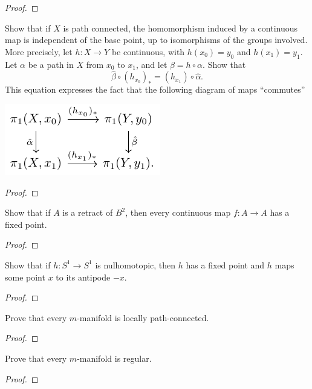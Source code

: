\begin{proof}
\end{proof}
\newpage
\begin{problem}[Munkres \S53, Ex.\,6]
Show that if $X$ is path connected, the homomorphism induced by a
continuous map is independent of the base point, up to
isomorphisms of the groups involved. More precisely, let $h\colon
X\to Y$ be continuous, with $h(x_0)=y_0$ and $h(x_1)=y_1$. Let
$\alpha$ be a path in $X$ from $x_0$ to $x_1$, and let
$\beta=h\circ\alpha$. Show that
\[
\hat\beta\circ(h_{x_0})_*=(h_{x_1})\circ\hat\alpha.
\]
This equation expresses the fact that the following diagram of
maps ``commutes''
\begin{center}
\includegraphics{figures/hw-10-path-connected-hom-indep}
\end{center}
\end{problem}
\begin{proof}
\end{proof}
\newpage
\begin{problem}[Munkres \S55, Ex.\,1]
Show that if $A$ is a retract of $B^2$, then every continuous map
$f\colon A\to A$ has a fixed point.
\end{problem}
\begin{proof}
\end{proof}
\newpage
\begin{problem}[Munkres \S55, Ex.\,2]
Show that if $h\colon S^1\to S^1$ is nulhomotopic, then $h$ has a
fixed point and $h$ maps some point $x$ to its antipode $-x$.
\end{problem}
\begin{proof}
\end{proof}
\newpage
\begin{problem}[(A)]
Prove that every $m$-manifold is locally path-connected.
\end{problem}
\begin{proof}
\end{proof}
\newpage
\begin{problem}[(B)]
Prove that every $m$-manifold is regular.
\end{problem}
\begin{proof}
\end{proof}

